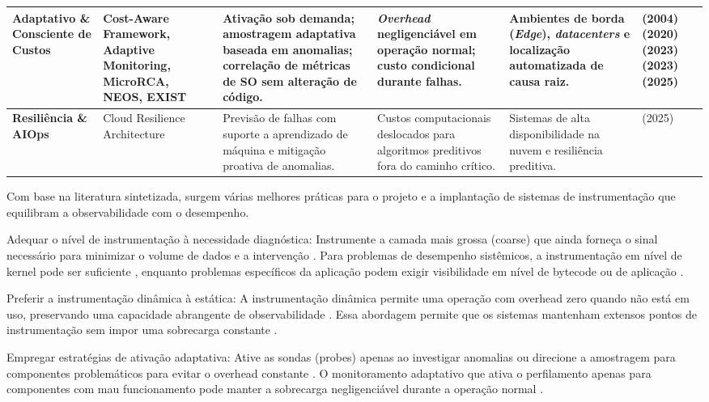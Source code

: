 \documentclass[sigconf, anonymous]{acmart}
\begin{document}
\begin{table}[htbp]
\begin{tabular}{|p{}|p{}|p{}|p{}|p{}|p{}|}
\textbf{Adaptativo \& Consciente de Custos} & Cost-Aware Framework, Adaptive Monitoring, MicroRCA, NEOS, EXIST & Ativação sob demanda; amostragem adaptativa baseada em anomalias; correlação de métricas de SO sem alteração de código. & \textit{Overhead} negligenciável em operação normal; custo condicional durante falhas. & Ambientes de borda (\textit{Edge}), \textit{datacenters} e localização automatizada de causa raiz. & \cite{mos_2004} (2004)\newline \cite{wu_2020} (2020)\newline \cite{haghshenas_2023} (2023)\newline \cite{kumar_2023} (2023)\newline \cite{wang_hou_2025} (2025) \\ \hline

\textbf{Resiliência \& AIOps} & Cloud Resilience Architecture & Previsão de falhas com suporte a aprendizado de máquina e mitigação proativa de anomalias. & Custos computacionais deslocados para algoritmos preditivos fora do caminho crítico. & Sistemas de alta disponibilidade na nuvem e resiliência preditiva. & \cite{jalukuri_2025} (2025) \\ \hline
\end{tabular}
\end{table}

Com base na literatura sintetizada, surgem várias melhores práticas para o projeto e a implantação de sistemas de instrumentação que equilibram a observabilidade com o desempenho.

Adequar o nível de instrumentação à necessidade diagnóstica: Instrumente a camada mais grossa (coarse) que ainda forneça o sinal necessário para minimizar o volume de dados e a intervenção \cite{vysocky_2019}. Para problemas de desempenho sistêmicos, a instrumentação em nível de kernel pode ser suficiente \cite{cantrill_2004}, enquanto problemas específicos da aplicação podem exigir visibilidade em nível de bytecode ou de aplicação \cite{wang_2025, marvis_2024}.

Preferir a instrumentação dinâmica à estática: A instrumentação dinâmica permite uma operação com overhead zero quando não está em uso, preservando uma capacidade abrangente de observabilidade \cite{cantrill_2004}. Essa abordagem permite que os sistemas mantenham extensos pontos de instrumentação sem impor uma sobrecarga constante \cite{cantrill_2004}.

Empregar estratégias de ativação adaptativa: Ative as sondas (probes) apenas ao investigar anomalias ou direcione a amostragem para componentes problemáticos para evitar o overhead constante \cite{mos_2004, haghshenas_2023}. O monitoramento adaptativo que ativa o perfilamento apenas para componentes com mau funcionamento pode manter a sobrecarga negligenciável durante a operação normal \cite{mos_2004}.
\end{document}
